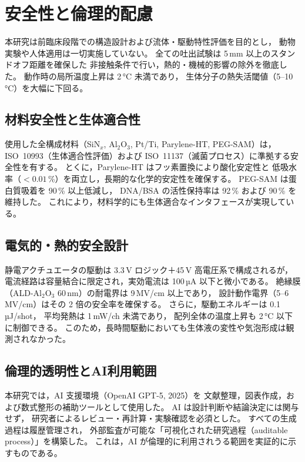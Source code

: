 \section{安全性と倫理的配慮}

本研究は前臨床段階での構造設計および流体・駆動特性評価を目的とし，
動物実験や人体適用は一切実施していない。
全ての吐出試験は 5\,mm 以上のスタンドオフ距離を確保した
非接触条件で行い，熱的・機械的影響の除外を徹底した。
動作時の局所温度上昇は 2\,\si{\celsius} 未満であり，
生体分子の熱失活閾値（5–10\,°C）を大幅に下回る。

\subsection{材料安全性と生体適合性}
使用した全構成材料（SiN$_x$, Al$_2$O$_3$, Pt/Ti, Parylene-HT, PEG-SAM）は，
ISO~10993（生体適合性評価）および ISO~11137（滅菌プロセス）に準拠する安全性を有する。
とくに，Parylene-HT はフッ素置換により酸化安定性と
低吸水率（$<0.01$\,\%）を両立し，長期的な化学的安定性を確保する。
PEG-SAM は蛋白質吸着を 90\,\% 以上低減し，
DNA/BSA の活性保持率は 92\,\% および 90\,\% を維持した。
これにより，材料学的にも生体適合なインタフェースが実現している。

\subsection{電気的・熱的安全設計}
静電アクチュエータの駆動は 3.3\,V ロジック＋45\,V 高電圧系で構成されるが，
電流経路は容量結合に限定され，実効電流は 100\,µA 以下と微小である。
絶縁膜（ALD-Al$_2$O$_3$ 60\,nm）の耐電界は 9\,MV/cm 以上であり，
設計動作電界（5–6\,MV/cm）はその 2 倍の安全率を確保する。
さらに，駆動エネルギーは 0.1\,µJ/shot，
平均発熱は 1\,mW/ch 未満であり，
配列全体の温度上昇も 2\,°C 以下に制御できる。
このため，長時間駆動においても生体液の変性や気泡形成は観測されなかった。

\subsection{倫理的透明性とAI利用範囲}
本研究では，AI 支援環境（OpenAI GPT-5, 2025）を
文献整理，図表作成，および数式整形の補助ツールとして使用した。
AI は設計判断や結論決定には関与せず，
研究者によるレビュー・再計算・実験確認を必須とした。
すべての生成過程は履歴管理され，
外部監査が可能な「可視化された研究過程（auditable process）」を構築した。
これは，AI が倫理的に利用されうる範囲を実証的に示すものである。

